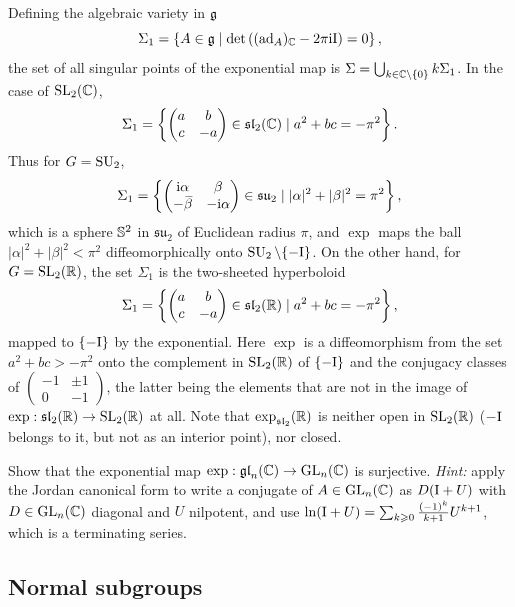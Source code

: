 \begin{example}
Defining the algebraic variety in $\mathfrak{g}$
\[\Sigma_1=\left\{A\in\mathfrak{g}\mid \det\left((\mathrm{ad}_A)_{\mathbb{C}} -2\pi\mathrm{i}  \mathrm{I}\right)=0\right\},\]
the set of all singular points of the exponential map is $\Sigma=\bigcup_{k\in\mathbb{C}\setminus\{0\}} k\Sigma_1$. In the case of $\operatorname{SL}_2(\mathbb{C})$,
\[\Sigma_1=\left\{\begin{pmatrix}
    a&b\\c&-a
\end{pmatrix}\in\mathfrak{sl}_2(\mathbb{C})\mid a^2+bc=-\pi^2\right\}.\]
Thus for $G=\operatorname{SU}_2$,
\[\Sigma_1=\left\{\begin{pmatrix}
    \i\alpha&\beta\\-\wb{\beta}&-\i\alpha
\end{pmatrix}\in\mathfrak{su}_2\mid |\alpha|^2+|\beta|^2=\pi^2\right\},\]
which is a sphere $\mathbb{S}^2$ in $\mathfrak{su}_2$ of Euclidean radius $\pi$, and $\exp$ maps the ball $|\alpha|^2+|\beta|^2<\pi^2$ diffeomorphically onto $\operatorname{SU}_2\setminus\{-\mathrm{I}\}$. On the other hand, for $G=\operatorname{SL}_2(\mathbb{R})$, the set $\Sigma_1$ is the two-sheeted hyperboloid
\[\Sigma_1=\left\{\begin{pmatrix}
    a&b\\c&-a
\end{pmatrix}\in\mathfrak{sl}_2(\mathbb{R})\mid a^2+bc=-\pi^2\right\},\]
mapped to $\{-\mathrm{I}\}$ by the exponential. Here $\exp$ is a diffeomorphism from the set $a^2+bc>-\pi^2$ onto the complement in $\operatorname{SL}_2(\mathbb{R})$ of $\{-\mathrm{I}\}$ and the conjugacy classes of $\left(\begin{smallmatrix}
    -1&\pm1\\0&-1
\end{smallmatrix}\right)$, the latter being the elements that are not in the image of $\exp:\mathfrak{sl}_2(\mathbb{R})\to \operatorname{SL}_2(\mathbb{R})$ at all. Note that $\exp_{\mathfrak{sl}_2}(\mathbb{R})$ is neither open in $\operatorname{SL}_2(\mathbb{R})$ ($-\mathrm{I}$ belongs to it, but not as an interior point), nor closed.
\end{example}

\begin{xca}
    Show that the exponential map $\exp:\mathfrak{gl}_n(\mathbb{C})\to \operatorname{GL}_n(\mathbb{C})$ is surjective. \emph{Hint:} apply the Jordan canonical form to write a conjugate of $A\in\operatorname{GL}_n(\mathbb{C})$ as $D(\mathrm{I}+U)$ with $D\in\operatorname{GL}_n(\mathbb{C})$ diagonal and $U$ nilpotent, and use $\ln(\mathrm{I}+U)=\sum_{k\geqslant 0} \frac{(-1)^k}{k+1}U^{k+1}$, which is a terminating series.
\end{xca}





\subsection{Normal subgroups}

